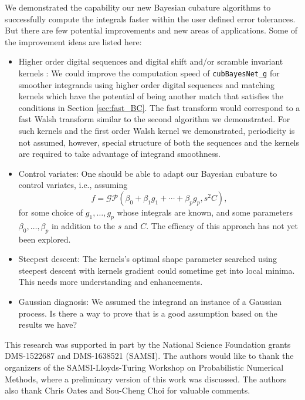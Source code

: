 \documentclass{iitthesis}          %
\newcommand{\code}[1]{\texttt{#1}}
\begin{document}
{{{{{{

We demonstrated the capability our new Bayesian cubature algorithms to successfully compute the integrals faster within the user defined error tolerances. But there are few potential improvements and new areas of applications.
Some of the improvement ideas are listed here:
\begin{itemize}
\item Higher order digital sequences and digital shift and/or scramble invariant kernels \cite{Nuyens2013} \cite{Bald12a}:
We could improve the computation speed of \code{cubBayesNet\_g} for smoother integrands using higher order digital sequences and matching kernels which have the potential of being another match that satisfies the conditions in Section \ref{sec:fast_BC}.  The fast transform would correspond to a fast Walsh transform similar to the second algorithm we demonstrated.  For such kernels and the first order Walsh kernel we demonstrated, periodicity is not assumed, however, special structure of both the sequences and the kernels are required to take advantage of integrand smoothness.

\item Control variates:
One should be able to adapt our Bayesian cubature to control variates, i.e., assuming  
\begin{equation*}
f = \mathcal{GP} \left( \beta_0 + \beta_1 g_1 + \cdots + \beta_p g_p, s^2 C \right),
\end{equation*}
for some choice of $g_1, \ldots, g_p$ whose integrals are known, and some parameters $\beta_0, \ldots, \beta_p$ in addition to the $s$ and $C$.  The efficacy of this approach has not yet been explored.

\item Steepest descent: 
The kernels's optimal shape parameter searched using steepest descent with kernels gradient could sometime get into local minima. This needs more understanding and enhancements.


\item Gaussian diagnosis: We assumed the integrand an instance of a Gaussian process. Is there a way to prove that is a good assumption based on the results we have?


\end{itemize}

\iffalse
{}

This research was supported in part by the National Science Foundation grants DMS-1522687 and DMS-1638521 (SAMSI).
The authors would like to thank the organizers of the SAMSI-Lloyds-Turing Workshop on Probabilistic Numerical Methods, where a preliminary version of this work was discussed.  The authors also thank Chris Oates and Sou-Cheng Choi for valuable comments.


}}}}}}
\end{document}
